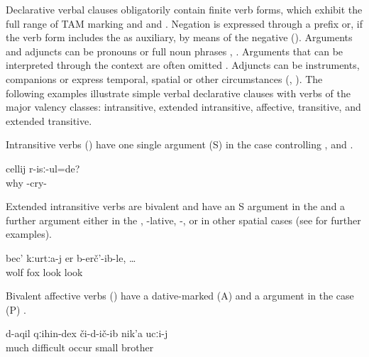 Declarative verbal clauses obligatorily contain finite verb forms, which exhibit the full range of TAM marking and  and . Negation is expressed through a prefix or, if the verb form includes the  as auxiliary, by means of the negative  (). Arguments and adjuncts can be pronouns or full noun phrases , . Arguments that can be interpreted through the context are often omitted . Adjuncts can be instruments, companions or express temporal, spatial or other circumstances (, ). The following examples illustrate simple verbal declarative clauses with verbs of the major valency classes: intransitive, extended intransitive, affective, transitive, and extended transitive. 

Intransitive verbs () have one single argument (S) in the  case controlling ,  and  .

\begin{exe}
	\ex	\label{ex:She is crying.Why}
	\gll	cellij r-isː-ul=de?	\\
		why -cry- 	\\
	\glt	{}
\end{exe}

Extended intransitive verbs are bivalent and have an S argument in the  and a further argument either in the , -lative, -, or in other spatial cases  (see  for further examples).
%
\begin{exe}
	\ex	\label{ex:The wolf looked at the fox}
	\gll	bec'	kːurtːa-j er	b-erč'-ib-le, \ldots	\\
		wolf	fox look	look	\\
	\glt	{}
\end{exe}

Bivalent affective verbs () have a dative-marked  (A) and a  argument in the  case (P) .
%
\begin{exe}
	\ex	\label{ex:‎‎‎The little brother experienced many difficulties}
	\gll	d-aqil	qːihin-dex	či-d-ič-ib	nik'a	ucːi-j\\
		much	difficult	occur	small	brother\\
	\glt	{}
\end{exe}

